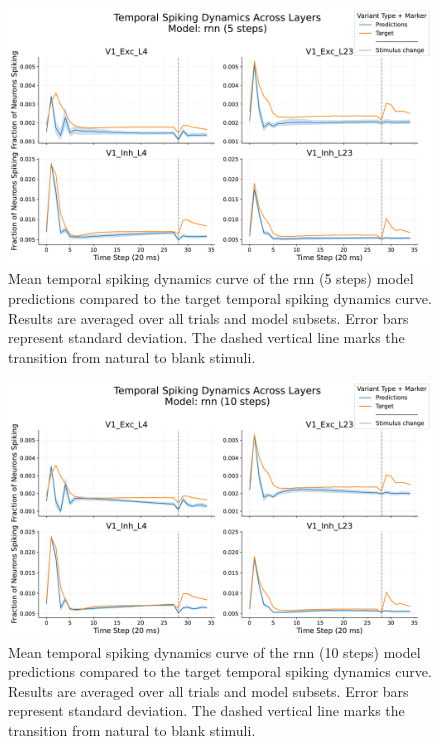 \begin{figure}
    \centering
    \includegraphics[width=\linewidth]{img/plots/separate_model_synchrony_curve_rnn_separate_5_evaluation.pdf}
    \caption{Mean temporal spiking dynamics curve of the rnn (5 steps) model predictions compared to the target temporal spiking dynamics curve. Results are averaged over all trials and model subsets. Error bars represent standard deviation. The dashed vertical line marks the transition from natural to blank stimuli.}
    \label{fig:synchrony_curve_rnn_5}
\end{figure}

\begin{figure}
    \centering
    \includegraphics[width=\linewidth]{img/plots/separate_model_synchrony_curve_rnn_separate_10_evaluation.pdf}
    \caption{Mean temporal spiking dynamics curve of the rnn (10 steps) model predictions compared to the target temporal spiking dynamics curve. Results are averaged over all trials and model subsets. Error bars represent standard deviation. The dashed vertical line marks the transition from natural to blank stimuli.}
    \label{fig:synchrony_curve_rnn_10}
\end{figure}


